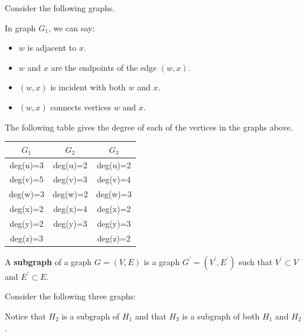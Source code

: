 \begin{exa}
Consider the following graphs.
 \begin{center}
\end{center}

\begin{minipage}[t]{.5\textwidth}
In graph $G_1$, we can say:
\begin{itemize}
\item
$w$ is adjacent to $x$.
\item
$w$ and $x$ are the endpoints of the edge $(w,x)$.
\item
$(w,x)$ is incident with both $w$ and $x$.
\item
$(w,x)$ connects vertices $w$ and $x$.
\end{itemize}
\end{minipage}
\hfill
\begin{minipage}[t]{.45\textwidth}
The following table gives the degree of each of the vertices in the graphs above.
\begin{center}
\begin{tabular}{|c|c|c|}
\hline
$G_1$&$G_2$&$G_3$\\
\hline
\hline
deg(u)=3&deg(u)=2&deg(u)=2\\
deg(v)=5&deg(v)=3&deg(v)=4\\
deg(w)=3&deg(w)=2&deg(w)=3\\
deg(x)=2&deg(x)=4&deg(x)=2\\
deg(y)=2&deg(y)=3&deg(y)=3\\
deg(z)=3&        &deg(z)=2\\
\hline
\end{tabular}
\end{center}
\end{minipage}
\end{exa}

\begin{df}
A {\bf subgraph} of a graph $G=(V,E)$ is a graph 
$G^{\prime}=(V^{\prime},E^{\prime})$ such that 
$V^{\prime}\subset V$ and 
$E^{\prime}\subset E$.
\end{df}

\begin{exa}
Consider the following three graphs:
\begin{center}
\end{center}
Notice that $H_2$ is a
subgraph of $H_1$ and that $H_3$ is a subgraph of both $H_1$ and $H_2$.
\end{exa}



